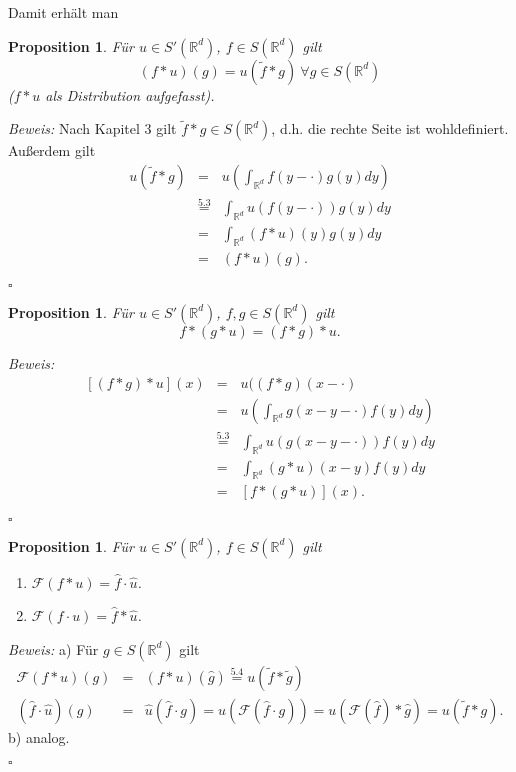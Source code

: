 \documentclass[11pt,a4paper,titlepage, ngerman]{scrartcl}
\newtheorem{Prop}[Satz]{Proposition}
\numberwithin{equation}{section}
\newcommand{\R}{\mathbb{R}} %
\newcommand{\f}{\hat{f}}
\newcommand{\g}{\hat{g}}
\newcommand{\F}{\mathcal{F}}
\newcommand{\m}{\cdot}
\newcommand{\Bew}{\emph{Beweis: }}
\newcommand{\qed}{\begin{flushright}
		$\square$
	\end{flushright}}
\begin{document}
	Damit erhält man
	\begin{Prop}
		Für $u\in S'(\R^d)$, $f\in S(\R^d)$ gilt $$(f*u)(g) = u(\tilde{f}*g) ~\forall g\in S(\R^d)$$
		($f*u$ als Distribution aufgefasst).
	\end{Prop}
	
	\Bew Nach Kapitel 3 gilt $\tilde{f}*g\in S(\R^d)$, d.h. die rechte Seite ist wohldefiniert. Außerdem gilt
	\begin{eqnarray}
		u(\tilde{f}*g) &=& u\left(\int_{\R^d}f(y-\m)g(y) dy \right)\nonumber\\
		&\overset{\text{5.3}}{=} & \int_{\R^d} u(f(y-\m))g(y)dy\nonumber\\
		&=& \int_{\R^d}(f*u)(y) g(y) dy\nonumber\\
		&=& (f*u)(g)\nonumber.
	\end{eqnarray}
	\qed
	
	\begin{Prop}
		Für $u\in S'(\R^d)$, $f,g\in S(\R^d)$ gilt 
		$$f*(g*u)= (f*g)*u.$$
	\end{Prop}
	
	\Bew 
	\begin{eqnarray}
		\left[(f*g)*u \right](x) &=& u((f*g)(x-\m)\nonumber\\
		&=& u\left(\int_{\R^d} g(x-y-\m)f(y) dy \right) \nonumber\\
		&\overset{\text{5.3}}{=}& \int_{\R^d} u(g(x-y-\m))f(y) dy\nonumber\\
		&=& \int_{\R^d} (g*u)(x-y)f(y)dy\nonumber\\
		&=& [f*(g*u)](x)\nonumber.
	\end{eqnarray}
	\qed
	
	\begin{Prop}
		Für $u\in S'(\R^d)$, $f\in S(\R^d)$ gilt
		\begin{enumerate}
			\item[a)] $\F(f*u) = \f\m \hat{u}$.
			\item[b)] $\F(f\m u) = \f *\hat{u}$.
		\end{enumerate}
	\end{Prop}
	
	\Bew a) Für $g\in S(\R^d)$ gilt
	\begin{eqnarray}
		\F(f*u)(g) &=& (f*u)(\g) \overset{\text{5.4}}{=} u(\tilde{f}*\tilde{g})\nonumber\\
		(\f\m \hat{u})(g) &=& \hat{u}(\f\m g) = u(\F(\f\m g)) = u(\F(\f)*\g) = u(\tilde{f}* g). \nonumber
	\end{eqnarray}
	b) analog.
	\qed
	
\end{document}
